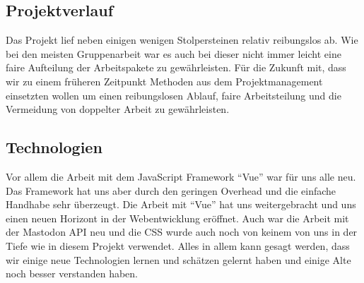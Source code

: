 \documentclass[fleqn,10pt]{SelfArx} %
\begin{document}
\subsection{Projektverlauf}
Das Projekt lief neben einigen wenigen Stolpersteinen relativ reibungslos ab. Wie bei den meisten Gruppenarbeit war es auch bei dieser nicht immer leicht eine faire Aufteilung der Arbeitspakete zu gewährleisten. Für die Zukunft mit, dass wir zu einem früheren Zeitpunkt Methoden aus dem Projektmanagement einsetzten wollen um einen reibungslosen Ablauf, faire Arbeitsteilung und die Vermeidung von doppelter Arbeit zu gewährleisten.
\subsection{Technologien}
Vor allem die Arbeit mit dem JavaScript Framework \enquote{Vue} war für uns alle neu. Das Framework hat uns aber durch den geringen Overhead und die einfache Handhabe sehr überzeugt. Die Arbeit mit \enquote{Vue} hat uns weitergebracht und uns einen neuen Horizont in der Webentwicklung eröffnet. 
Auch war die Arbeit mit der Mastodon API neu und die CSS wurde auch noch von keinem von uns in der Tiefe wie in diesem Projekt verwendet. Alles in allem kann gesagt werden, dass wir einige neue Technologien lernen und schätzen gelernt haben und einige Alte noch besser verstanden haben.
\end{document}
